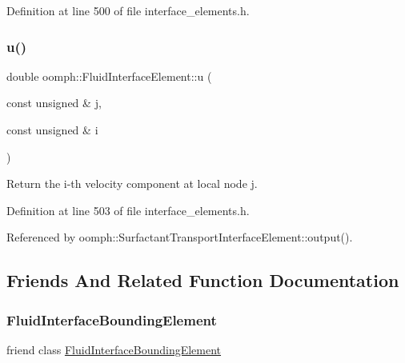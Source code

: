 Definition at line 500 of file interface\+\_\+elements.\+h.

\mbox{\label{classoomph_1_1FluidInterfaceElement_a50a509413ea7f2a481678837846dd476}} 
\subsubsection{\texorpdfstring{u()}{u()}}
{\footnotesize\ttfamily double oomph\+::\+Fluid\+Interface\+Element\+::u (\begin{DoxyParamCaption}\item[{const unsigned \&}]{j,  }\item[{const unsigned \&}]{i }\end{DoxyParamCaption})\hspace{0.3cm}{\ttfamily [inline]}}



Return the i-\/th velocity component at local node j. 



Definition at line 503 of file interface\+\_\+elements.\+h.



Referenced by oomph\+::\+Surfactant\+Transport\+Interface\+Element\+::output().



\subsection{Friends And Related Function Documentation}
\mbox{\label{classoomph_1_1FluidInterfaceElement_af0eab9c2aa8fc5a5006df03ab93c015f}} 
\subsubsection{\texorpdfstring{Fluid\+Interface\+Bounding\+Element}{FluidInterfaceBoundingElement}}
{\footnotesize\ttfamily friend class \hyperlink{classoomph_1_1FluidInterfaceBoundingElement}{Fluid\+Interface\+Bounding\+Element}\hspace{0.3cm}{\ttfamily [friend]}}



